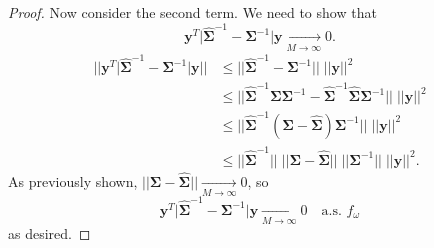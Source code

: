 \begin{proof}
Now consider the second term. We need to show that
\[
  \bm{y}^T \Big| \widehat{\bm{\Sigma}}^{-1} - \bm{\Sigma}^{-1} \Big| \bm{y} \xrightarrow[M \to \infty]{} 0.
\]
\begin{align*}
  \Big|\Big| \bm{y}^T \big| \widehat{\bm{\Sigma}}^{-1} - \bm{\Sigma}^{-1} \big| \bm{y} \Big|\Big| &\leq ||\widehat{\bm{\Sigma}}^{-1} - \bm{\Sigma}^{-1}|| \; ||\bm{y}||^2 \\
  &\leq || \widehat{\bm{\Sigma}}^{-1} \bm{\Sigma} \bm{\Sigma}^{-1} - \widehat{\bm{\Sigma}}^{-1} \widehat{\bm{\Sigma}} \bm{\Sigma}^{-1} || \; ||\bm{y}||^2 \\
  &\leq || \widehat{\bm{\Sigma}}^{-1} (\bm{\Sigma} - \widehat{\bm{\Sigma}}) \bm{\Sigma}^{-1} || \; ||\bm{y}||^2 \\
  &\leq || \widehat{\bm{\Sigma}}^{-1} || \; || \bm{\Sigma} - \widehat{\bm{\Sigma}} || \; || \bm{\Sigma}^{-1} || \; ||\bm{y}||^2.
\end{align*}
As previously shown, $|| \bm{\Sigma} - \widehat{\bm{\Sigma}} || \xrightarrow[M \to \infty]{} 0$, so
\[
  \bm{y}^T \Big| \widehat{\bm{\Sigma}}^{-1} - \bm{\Sigma}^{-1} \Big| \bm{y} \xrightarrow[M \to \infty]{} 0 \quad \textrm{a.s. } f_\omega
\]
as desired.

\end{proof}